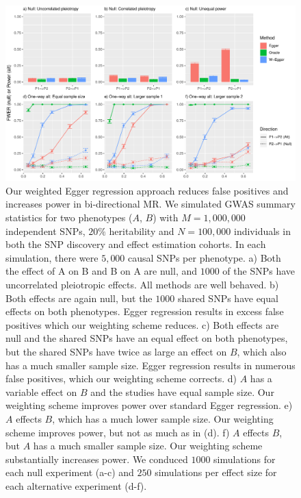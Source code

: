 \documentclass{article}
\begin{document}
\begin{figure}\label{figure1}
\includegraphics[width=\textwidth]{figures/figure1.pdf}
\caption{Our weighted Egger regression approach reduces false positives and increases power in bi-directional MR. We simulated GWAS summary statistics for two phenotypes ($A$, $B$) with $M=1,000,000$
independent SNPs, $20\%$ heritability and $N = 100,000$ individuals in both
 the SNP discovery and effect estimation cohorts. In each simulation, there
 were $5,000$ causal SNPs per phenotype. a) Both the effect of A on B and B on A are null,
 and $1000$ of the SNPs have uncorrelated pleiotropic effects. All methods are well behaved.
 b) Both effects are again null, but the $1000$ shared SNPs have equal effects on both
 phenotypes. Egger regression results in excess false positives which our weighting scheme
 reduces. c) Both effects are null and the shared SNPs have an equal effect on both phenotypes,
 but the shared SNPs have twice as large an effect on $B$, which also has a much smaller sample
 size. Egger regression results in numerous false positives, which our weighting scheme corrects.
 d) $A$ has a variable effect on $B$ and the studies have equal sample size. Our weighting
 scheme improves power over standard Egger regression. e) $A$ effects $B$, which has a much
 lower sample size. Our weighting scheme improves power, but not as much as in (d). f) $A$
  effects $B$, but $A$ has a much smaller sample size. Our weighting scheme substantially increases
  power. We conduced $1000$ simulations for each null experiment (a-c) and $250$ simulations
  per effect size for each alternative experiment (d-f). }
\end{figure}
\end{document}

